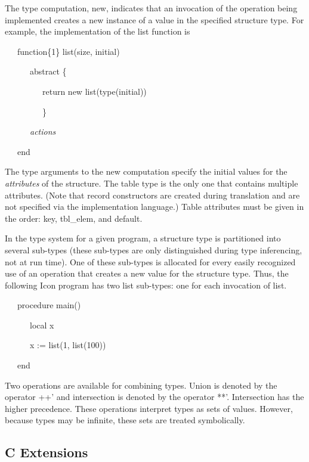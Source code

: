 The type computation, new, indicates that an invocation of the
operation being implemented creates a new instance of a value in the
specified structure type. For example, the implementation of the list
function is

{\ttfamily\mdseries
\ \ \ function\{1\} list(size, initial)}

{\ttfamily\mdseries
\ \ \ \ \ \ abstract \{}

{\ttfamily\mdseries
\ \ \ \ \ \ \ \ \ return new list(type(initial))}

{\ttfamily\mdseries
\ \ \ \ \ \ \ \ \ \}}

{\ttfamily\mdseries
\ \ \ \ \ \ \textit{actions}}

{\ttfamily\mdseries
\ \ \ end}

The type arguments to the new computation specify the initial values
for the \textit{attributes} of the structure. The table type is the
only one that contains multiple attributes. (Note that record
constructors are created during translation and are not specified via
the implementation language.) Table attributes must be given in the
order: key, tbl\_elem, and default.

In the type system for a given program, a structure type is
partitioned into several sub-types (these sub-types are only
distinguished during type inferencing, not at run time). One of these
sub-types is allocated for every easily recognized use of an operation
that creates a new value for the structure type. Thus, the following
Icon program has two list sub-types: one for each invocation of list.

{\ttfamily\mdseries
\ \ \ procedure main()}

{\ttfamily\mdseries
\ \ \ \ \ \ local x}


\bigskip

{\ttfamily\mdseries
\ \ \ \ \ \ x := list(1, list(100))}

{\ttfamily\mdseries
\ \ \ end}

Two operations are available for combining types. Union is denoted by
the operator {\textasciigrave}++' and intersection is denoted by the
operator {\textasciigrave}**'. Intersection has the higher
precedence. These operations interpret types as sets of
values. However, because types may be infinite, these sets are treated
symbolically.

\subsection{C Extensions}


